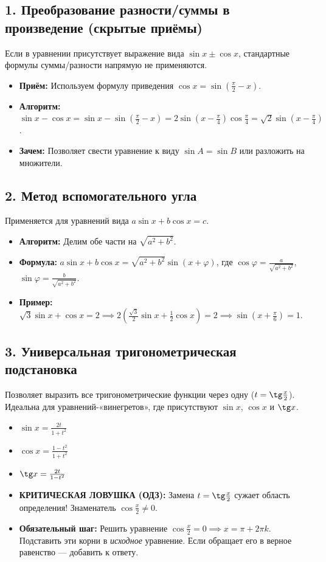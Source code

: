 \documentclass[a4paper,12pt]{article}
\begin{document}
\subsection*{1. Преобразование разности/суммы в произведение (скрытые приёмы)}
Если в уравнении присутствует выражение вида $\sin x \pm \cos x$, стандартные формулы суммы/разности напрямую не применяются. 
\begin{itemize}[leftmargin=*, itemsep=2pt]
    \item \textbf{Приём:} Используем формулу приведения $\cos x = \sin\left(\frac{\pi}{2} - x\right)$.
    \item \textbf{Алгоритм:} $\sin x - \cos x = \sin x - \sin\left(\frac{\pi}{2} - x\right) = 2\sin\left(x - \frac{\pi}{4}\right)\cos\frac{\pi}{4} = \sqrt{2}\sin\left(x - \frac{\pi}{4}\right)$.
    \item \textbf{Зачем:} Позволяет свести уравнение к виду $\sin A = \sin B$ или разложить на множители.
\end{itemize}

\subsection*{2. Метод вспомогательного угла}
Применяется для уравнений вида $a\sin x + b\cos x = c$.
\begin{itemize}[leftmargin=*, itemsep=2pt]
    \item \textbf{Алгоритм:} Делим обе части на $\sqrt{a^2 + b^2}$.
    \item \textbf{Формула:} $a\sin x + b\cos x = \sqrt{a^2+b^2}\sin(x + \varphi)$, где $\cos\varphi = \frac{a}{\sqrt{a^2+b^2}}$, $\sin\varphi = \frac{b}{\sqrt{a^2+b^2}}$.
    \item \textbf{Пример:} $\sqrt{3}\sin x + \cos x = 2 \implies 2\left(\frac{\sqrt{3}}{2}\sin x + \frac{1}{2}\cos x\right) = 2 \implies \sin\left(x + \frac{\pi}{6}\right) = 1$.
\end{itemize}

\subsection*{3. Универсальная тригонометрическая подстановка}
Позволяет выразить все тригонометрические функции через одну ($t = \tg\frac{x}{2}$). Идеальна для уравнений-«винегретов», где присутствуют $\sin x$, $\cos x$ и $\tg x$.
\begin{itemize}[leftmargin=*, itemsep=2pt]
    \item $\sin x = \frac{2t}{1+t^2}$
    \item $\cos x = \frac{1-t^2}{1+t^2}$
    \item $\tg x = \frac{2t}{1-t^2}$
    \item \textbf{КРИТИЧЕСКАЯ ЛОВУШКА (ОДЗ):} Замена $t = \tg\frac{x}{2}$ сужает область определения! Знаменатель $\cos\frac{x}{2} \neq 0$. 
    \item \textbf{Обязательный шаг:} Решить уравнение $\cos\frac{x}{2} = 0 \implies x = \pi + 2\pi k$. Подставить эти корни в \textit{исходное} уравнение. Если обращает его в верное равенство --- добавить к ответу.
\end{itemize}
\end{document}
